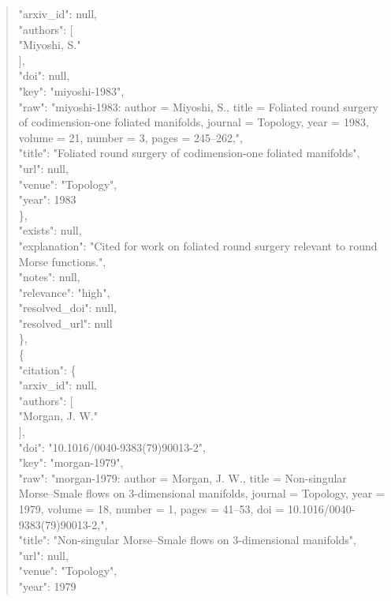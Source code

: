 \documentclass[11pt]{article}
\begin{document}
\begin{quote}
        "arxiv\_id": null,\\
        "authors": [\\
          "Miyoshi, S."\\
        ],\\
        "doi": null,\\
        "key": "miyoshi-1983",\\
        "raw": "miyoshi-1983: author = Miyoshi, S., title = Foliated round surgery of codimension-one foliated manifolds, journal = Topology, year = 1983, volume = 21, number = 3, pages = 245--262,",\\
        "title": "Foliated round surgery of codimension-one foliated manifolds",\\
        "url": null,\\
        "venue": "Topology",\\
        "year": 1983\\
      \},\\
      "exists": null,\\
      "explanation": "Cited for work on foliated round surgery relevant to round Morse functions.",\\
      "notes": null,\\
      "relevance": "high",\\
      "resolved\_doi": null,\\
      "resolved\_url": null\\
    \},\\
    \{\\
      "citation": \{\\
        "arxiv\_id": null,\\
        "authors": [\\
          "Morgan, J. W."\\
        ],\\
        "doi": "10.1016/0040-9383(79)90013-2",\\
        "key": "morgan-1979",\\
        "raw": "morgan-1979: author = Morgan, J. W., title = Non-singular Morse--Smale flows on 3-dimensional manifolds, journal = Topology, year = 1979, volume = 18, number = 1, pages = 41--53, doi = 10.1016/0040-9383(79)90013-2,",\\
        "title": "Non-singular Morse--Smale flows on 3-dimensional manifolds",\\
        "url": null,\\
        "venue": "Topology",\\
        "year": 1979\\

\end{quote}
\end{document}
